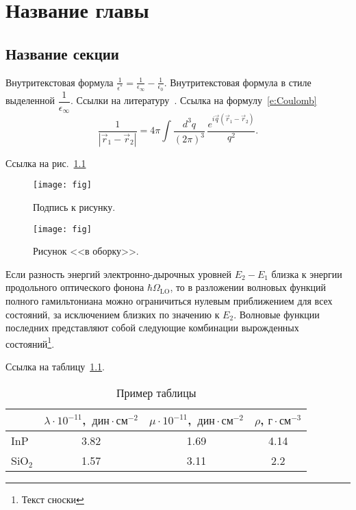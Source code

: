 \chapter{Название главы}
\section{Название секции}

Внутритекстовая формула $\frac{1}{\epsilon^*}=\frac{1}{\epsilon_\infty}-\frac{1}{\epsilon_0}$.
Внутритекстовая формула в стиле выделенной $\dfrac{1}{\epsilon_\infty}$.
Ссылки на литературу~\cite{Yoffe_1993_AP_42_173,Efros_1982_FTP_16_7_1209,%
Anselm_1978,Segall_1968,Agranovich_1983,InP,Mishchenko_1996,Skvortsov_2008,%
Perelman_2003_math:0307245,Nielsen_2010_1006.2735,patent1,patent2}. Ссылка на формулу~\eqref{e:Coulomb}
\begin{equation}\label{e:Coulomb}
  \frac{1}{|\vec r_1 - \vec r_2|} =
  4\pi \int \frac{d^3 q}{(2\pi)^3}\,
  \frac{e^{i\vec q(\vec r_1 - \vec r_2)}}{q^2}.
\end{equation}

Ссылка на рис.~\ref{f:fig}
\begin{figure}[!ht]
  \centering
  \texttt{[image: fig]}
  \caption{\label{f:fig}%
  Подпись к рисунку.
  }
\end{figure}

\begin{wrapfigure}{r}{0.35\textwidth}
\centering
\texttt{[image: fig]}
\caption{\label{f:ff}%
Рисунок <<в оборку>>.
}
\end{wrapfigure}

Если разность энергий электронно-дырочных уровней $E_2 - E_1$ близка к энергии продольного оптического фонона $\hbar\Omega_{\mathrm{LO}}$, то в разложении волновых функций полного гамильтониана можно ограничиться нулевым приближением для всех состояний, за исключением близких по значению к $E_2$.
Волновые функции последних представляют собой следующие комбинации вырожденных состояний\footnote{Текст сноски}.

Ссылка на таблицу~\ref{t:InPSiO2}.
\begin{table}[!ht]
  \centering
  \caption{Пример таблицы}\label{t:InPSiO2}
  \begin{tabular}{l|ccc}
    \hline\hline
    & \quad$\lambda \cdot 10^{-11}$,~$\text{дин}\cdot\text{см}^{-2}$
    & \quad$\mu \cdot 10^{-11}$,~$\text{дин}\cdot\text{см}^{-2}$
    & \quad$\rho$, $\text{г}\cdot\text{см}^{-3}$ \\
    \hline
    InP       & 3.82 & 1.69 & 4.14 \\
    SiO$_{2}$ & 1.57 & 3.11 & 2.2  \\
    \hline\hline
  \end{tabular}
\end{table}

